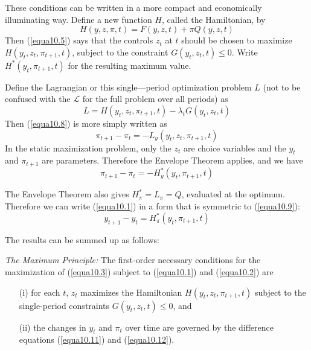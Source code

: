 These conditions can be written in a more compact and economically illuminating way. Define a new function $H$, called the Hamiltonian, by
\begin{equation} \label{equa10.9}
H(y,z,\pi,t) = F(y,z,t) + \pi Q(y,z,t)
\end{equation}
Then (\ref{equa10.5}) says that the controls $z_t$ at $t$ should be chosen to maximize $H(y_t, z_t, \pi_{t+1},t)$, subject to the constraint $G(y_t, z_t, t) \leq 0$. Write $H^*(y_t, \pi_{t+1}, t)$ for the resulting maximum value.

Define the Lagrangian or this single—period optimization problem $L$ (not to be confused with the $\mathcal{L}$ for the full problem over all periods) as
\begin{equation} \label{equa10.10}
L = H(y_t, z_t, \pi_{t+1}, t) - \lambda_t G(y_t, z_t, t)
\end{equation}
Then (\ref{equa10.8}) is more simply written as
\begin{equation*} 
\pi_{t+1} - \pi_t = -L_y(y_t, z_t, \pi_{t+1}, t)  
\end{equation*}
In the static maximization problem, only the $z_t$ are choice variables and the $y_t$ and $\pi_{t+1}$ are parameters. Therefore the Envelope Theorem applies, and we have
\begin{equation} \label{equa10.11}
 \pi_{t+1} - \pi_t = -H_y^*(y_t, \pi_{t+1}, t)  
\end{equation}

The Envelope Theorem also gives $H_\pi^* = L_\pi = Q$, evaluated at the optimum. Therefore we can write (\ref{equa10.1}) in a form that is symmetric to (\ref{equa10.9}):
\begin{equation} \label{equa10.12}
y_{t+1} - y_t = H_\pi^*(y_t, \pi_{t+1}, t)
\end{equation}

The results can be summed up as follows:

\textit{The Maximum Principle:} The first-order necessary conditions for the maximization of (\ref{equa10.3}) subject to (\ref{equa10.1}) and (\ref{equa10.2}) are 
\begin{itemize}
\item[(i)] for each $t$, $z_t$ maximizes the Hamiltonian $H(y_t, z_t, \pi_{t+1}, t)$ subject to the single-period constraints $G(y_t, z_t, t) \leq 0$, and 
\item [(ii)] the changes in $y_t$ and $\pi_t$ over time are governed by the difference equations (\ref{equa10.11}) and (\ref{equa10.12}).
\end{itemize}

